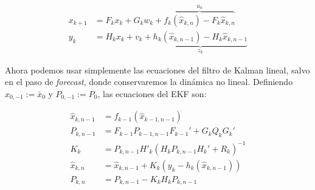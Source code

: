\begin{equation}
\begin{aligned}
x_{k+1} &= F_k x_k + G_k w_k + \overbrace{f_k(\hat{x}_{k,n}) - F_k \hat{x}_{k,n}}^{u_k} \\
y_{k} &= H_k x_k + v_k + \underbrace{h_k(\hat{x}_{k,n-1}) - H_k \hat{x}_{k,n-1}}_{z_k}
\end{aligned}
\end{equation}


Ahora podemos usar simplemente las ecuaciones del filtro de Kalman lineal, salvo en el paso de \textit{forecast}, donde conservaremos la dinámica no lineal. Definiendo \(\hat{x}_{0,-1}:= \bar{x}_0\) y \(P_{0,-1}:= P_0\), las ecuaciones del EKF son:

\begin{equation}\label{eq:kalman-extended}
\begin{aligned}
\hat{x}_{k,n-1} &= f_{k-1}( \hat{x}_{k-1,n-1}) \\
P_{k,n-1} &= F_{k-1} P_{k-1,n-1} F_{k-1}' + G_k Q_k G_k'\\
K_k &= P_{k,n-1} H'_{k}(H_{k}P_{k,n-1}H_{k}' + R_k)^{-1}\\
\hat{x}_{k,n} &= \hat{x}_{k, n-1} + K_k(y_k-h_k(\hat{x}_{k,n-1})) \\
P_{k,n} &= P_{k,n-1}- K_k H_{k}P_{k,n-1} \\
\end{aligned}
\end{equation}










